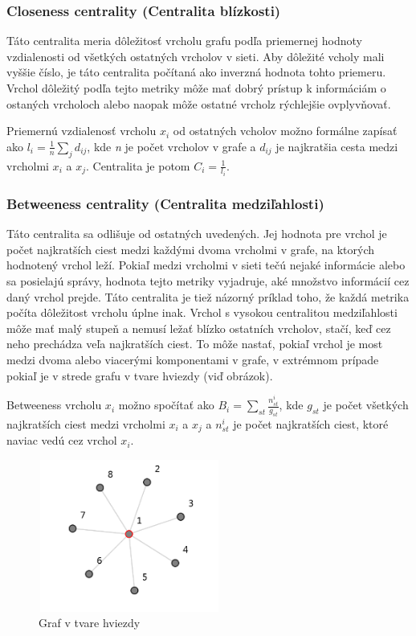 \documentclass[slovak,master,public,dept460,male,cpdeclaration,oneside]{diploma}
\begin{document}
\subsubsection{Closeness centrality (Centralita blízkosti)}
Táto centralita meria dôležitosť vrcholu grafu podľa priemernej hodnoty vzdialenosti od všetkých ostatných vrcholov v sieti. Aby dôležité vcholy mali vyššie číslo, je táto centralita počítaná ako inverzná hodnota tohto priemeru. Vrchol dôležitý podľa tejto metriky môže mať dobrý prístup k informáciám o ostaných vrcholoch alebo naopak môže ostatné vrcholz rýchlejšie ovplyvňovať.

Priemernú vzdialenosť vrcholu ${x_{i}}$ od ostatných vcholov možno formálne zapísať ako ${l_{i} = \frac{1}{n}\sum_{j}d_{ij}}$, kde \textit{n} je počet vrcholov v grafe a ${d_{ij}}$ je najkratšia cesta medzi vrcholmi  ${x_{i}}$ a  ${x_{j}}$. Centralita je potom  ${C_{i} = \frac{1}{l_{i}}}$.



\subsubsection{Betweeness centrality (Centralita medziľahlosti)}
Táto centralita sa odlišuje od ostatných uvedených. Jej hodnota pre vrchol je počet najkratších ciest medzi každými dvoma vrcholmi v grafe, na ktorých hodnotený vrchol leží. Pokiaľ medzi vrcholmi v sieti tečú nejaké informácie alebo sa posielajú správy, hodnota tejto metriky vyjadruje, aké množstvo informácií cez daný vrchol prejde. Táto centralita je tiež názorný príklad toho, že každá metrika počíta dôležitost vrcholu úplne inak. Vrchol s vysokou centralitou medziľahlosti môže mať malý stupeň a nemusí ležať blízko ostatních vrcholov, stačí, keď cez neho  prechádza veľa najkratších ciest. To môže nastať, pokiaľ vrchol je most medzi dvoma alebo viacerými komponentami v grafe, v extrémnom prípade pokiaľ je v strede grafu v tvare hviezdy (viď obrázok).

Betweeness vrcholu ${x_{i}}$ možno spočítať ako ${B_{i} = \sum_{st}^{}\frac{n^{i}_{st}}{g_{st}}}$, kde ${g_{st}}$ je počet všetkých najkratších ciest medzi vrcholmi ${x_{i}}$ a ${x_{j}}$ a ${n^{i}_{st}}$ je počet najkratších ciest, ktoré naviac vedú cez vrchol ${x_{i}}$. 

\begin{figure}[H]
\centering
\includegraphics[width=6cm, height=5cm]{figures/graph_star}
\caption{Graf v tvare hviezdy}
\end{figure}
\end{document}
